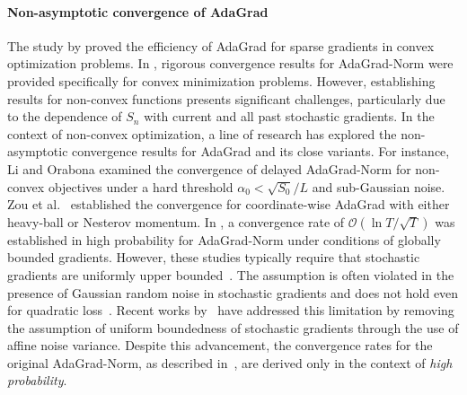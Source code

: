 \documentclass[standalone]{article}
\begin{document}
\paragraph{\textbf{Non-asymptotic convergence of AdaGrad}} The study by \cite{duchi2011adaptive} proved the efficiency of AdaGrad for sparse gradients in convex optimization problems. In \cite{levy2017online}, rigorous convergence results for AdaGrad-Norm were provided specifically for convex minimization problems. However, establishing results for non-convex functions presents significant challenges, particularly due to the dependence of $S_n$ with current and all past stochastic gradients. In the context of non-convex optimization, a line of research \citep{zou2018weighted,zhou2018convergence,chen2019convergence,ward2020adagrad,defossez2020simple,kavis2022high} has explored the non-asymptotic convergence results for AdaGrad and its close variants. For instance, Li and Orabona \citep{li2019convergence} examined the convergence of delayed AdaGrad-Norm for non-convex objectives under a hard threshold $\alpha_0 < \sqrt{S_0}/L$ and sub-Gaussian noise.  Zou et al.~\citep{zou2018weighted} established the convergence for coordinate-wise AdaGrad with either heavy-ball or Nesterov momentum. %
In \cite{ward2020adagrad}, a convergence rate of $\mathcal{O}(\ln T/\sqrt{T})$ was established in high probability for AdaGrad-Norm under conditions of globally bounded gradients. However, these studies typically require that stochastic gradients are uniformly upper bounded~\citep{zou2018weighted,zhou2018convergence,chen2019convergence,ward2020adagrad,defossez2020simple,kavis2022high}. The assumption is often violated in the presence of Gaussian random noise in stochastic gradients and does not hold even for quadratic loss~\citep{wang2023convergence}. Recent works by~\cite{faw2022power,wang2023convergence} have addressed this limitation by removing the assumption of uniform boundedness of stochastic gradients through the use of affine noise variance. Despite this advancement, %
the convergence rates for the original AdaGrad-Norm, as described in~\cite{faw2022power,wang2023convergence}, are derived only in the context of \emph{high probability}. %
\end{document}
